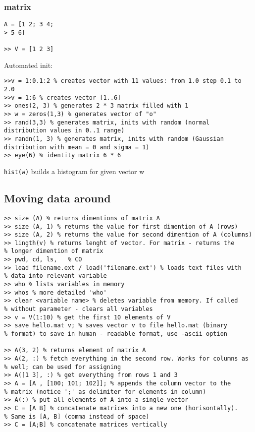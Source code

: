 \documentclass{scrartcl}
\begin{document}
\subsubsection {matrix}
\begin{verbatim}
A = [1 2; 3 4;
> 5 6]

>> V = [1 2 3]
\end{verbatim}
Automated init:
\begin{verbatim}
>>v = 1:0.1:2 % creates vector with 11 values: from 1.0 step 0.1 to 2.0
>>v = 1:6 % creates vector [1..6]
>> ones(2, 3) % generates 2 * 3 matrix filled with 1
>> w = zeros(1,3) % generates vector of "o"
>> rand(3,3) % generates matrix, inits with random (normal
distribution values in 0..1 range)
>> randn(1, 3) % generates matrix, inits with random (Gaussian
distribution with mean = 0 and sigma = 1)
>> eye(6) % identity matrix 6 * 6
\end{verbatim}
\verb!hist(w)! builds a histogram for given vector w

\subsection {Moving data around}
\label{5-2}
\begin{verbatim}
>> size (A) % returns dimentions of matrix A
>> size (A, 1) % returns the value for first dimention of A (rows)
>> size (A, 2) % returns the value for second dimention of A (columns)
>> lingth(v) % returns lenght of vector. For matrix - returns the
% longer dimention of matrix
>> pwd, cd, ls,   % CO
>> load filename.ext / load('filename.ext') % loads text files with
% data into relevant variable
>> who % lists variables in memory
>> whos % more detailed 'who'
>> clear <variable name> % deletes variable from memory. If called
% without parameter - clears all variables
>> v = V(1:10) % get the first 10 elements of V
>> save hello.mat v; % saves vector v to file hello.mat (binary
% format) to save in human - readable format, use -ascii option

>> A(3, 2) % returns element of matrix A
>> A(2, :) % fetch everything in the second row. Works for columns as
% well; can be used for assigning
>> A([1 3], :) % get everything from rows 1 and 3
>> A = [A , [100; 101; 102]]; % appends the column vector to the
% matrix (notice ';' as delimiter for elements in column)
>> A(:) % put all elements of A into a single vector
>> C = [A B] % concatenate matrices into a new one (horisontally).
% Same is [A, B] (comma instead of space)
>> C = [A;B] % concatenate matrices vertically 
\end{verbatim}
\end{document}
